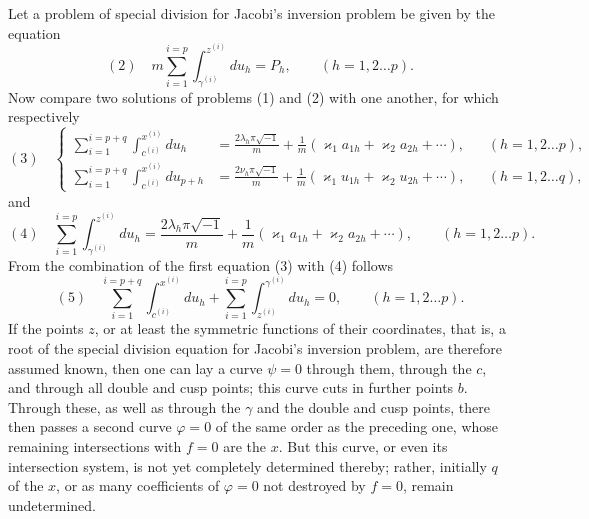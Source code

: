\documentclass[10pt]{article}
\begin{document}
Let a problem of special division for Jacobi's inversion problem be given by the equation
\[
(2)\quad m\sum_{i=1}^{i=p}\int_{\gamma^{(i)}}^{z^{(i)}}du_h=P_h,
\qquad (h=1,2\ldots p).
\]
Now compare two solutions of problems (1) and (2) with one another, for which respectively
\[
(3)\quad
\left\{\begin{aligned}
\sum_{i=1}^{i=p+q}\int_{c^{(i)}}^{x^{(i)}}du_h
&=\frac{2\lambda_h\pi\sqrt{-1}}{m}
+\frac1m(\varkappa_1a_{1h}+\varkappa_2a_{2h}+\cdots),
&& (h=1,2\ldots p),\\
\sum_{i=1}^{i=p+q}\int_{c^{(i)}}^{x^{(i)}}du_{p+h}
&=\frac{2\nu_h\pi\sqrt{-1}}{m}
+\frac1m(\varkappa_1u_{1h}+\varkappa_2u_{2h}+\cdots),
&& (h=1,2\ldots q),
\end{aligned}\right.
\]
and
\[
(4)\quad
\sum_{i=1}^{i=p}\int_{\gamma^{(i)}}^{z^{(i)}}du_h
=\frac{2\lambda_h\pi\sqrt{-1}}{m}
+\frac1m(\varkappa_1a_{1h}+\varkappa_2a_{2h}+\cdots),
\qquad (h=1,2\ldots p).
\]
From the combination of the first equation (3) with (4) follows
\[
(5)\quad
\sum_{i=1}^{i=p+q}\int_{c^{(i)}}^{x^{(i)}}du_h
+\sum_{i=1}^{i=p}\int_{z^{(i)}}^{\gamma^{(i)}}du_h=0,
\qquad (h=1,2\ldots p).
\]
If the points \(z\), or at least the symmetric functions of their coordinates, that is, a root of the special division equation for Jacobi's inversion problem, are therefore assumed known, then one can lay a curve \(\psi=0\) through them, through the \(c\), and through all double and cusp points; this curve cuts in further points \(b\). Through these, as well as through the \(\gamma\) and the double and cusp points, there then passes a second curve \(\varphi=0\) of the same order as the preceding one, whose remaining intersections with \(f=0\) are the \(x\). But this curve, or even its intersection system, is not yet completely determined thereby; rather, initially \(q\) of the \(x\), or as many coefficients of \(\varphi=0\) not destroyed by \(f=0\), remain undetermined.
\end{document}
